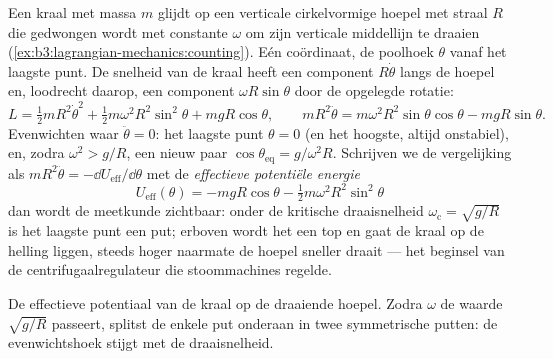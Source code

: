 \begin{example}\label{ex:b3:lagrangian-mechanics:hoop}
Een kraal met massa $m$ glijdt op een verticale cirkelvormige hoepel met
straal $R$ die gedwongen wordt met constante $\omega$ om zijn verticale
middellijn te draaien (\cref{ex:b3:lagrangian-mechanics:counting}). Eén
coördinaat, de poolhoek $\theta$ vanaf het laagste punt. De snelheid van
de kraal heeft een component $R\dot\theta$ langs de hoepel en, loodrecht
daarop, een component $\omega R\sin\theta$ door de opgelegde rotatie:
\[
L = \tfrac12 mR^2\dot\theta^2 + \tfrac12 m\omega^2R^2\sin^2\theta
 + mgR\cos\theta ,
\qquad
mR^2\ddot\theta = m\omega^2R^2\sin\theta\cos\theta - mgR\sin\theta .
\]
Evenwichten waar $\ddot\theta = 0$: het laagste punt $\theta = 0$ (en het
hoogste, altijd onstabiel), en, zodra $\omega^2 > g/R$, een nieuw paar
$\cos\theta_{\text{eq}} = g/\omega^2R$. Schrijven we de vergelijking als
$mR^2\ddot\theta = -\dd U_{\text{eff}}/\dd\theta$ met de \emph{effectieve
potentiële energie}
\[
U_{\text{eff}}(\theta) = -mgR\cos\theta
 - \tfrac12 m\omega^2R^2\sin^2\theta
\]
dan wordt de meetkunde zichtbaar: onder de kritische draaisnelheid
$\omega_{\text{c}} = \sqrt{g/R}$ is het laagste punt een put; erboven
wordt het een top en gaat de kraal op de helling liggen, steeds hoger
naarmate de hoepel sneller draait --- het beginsel van de
centrifugaalregulateur die stoommachines regelde.
\end{example}

\begin{omfigure}

{\small De effectieve potentiaal van de kraal op de draaiende hoepel.
Zodra $\omega$ de waarde $\sqrt{g/R}$ passeert, splitst de enkele put
onderaan in twee symmetrische putten: de evenwichtshoek stijgt met de
draaisnelheid.}
\end{omfigure}

